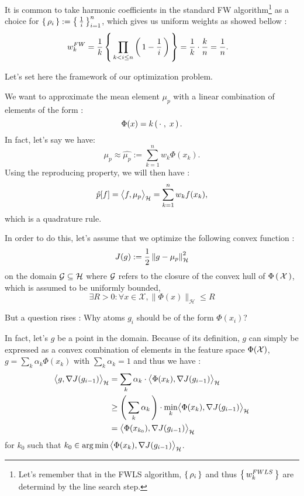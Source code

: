 It is common to take harmonic coefficients in the standard FW algorithm\footnote{Let's remember that in the FWLS algorithm, $\left \{ \, \rho_i \, \right \}$ and thus $\left \{ \, w_k^{FWLS} \, \right \}$ are
determind by the line search step.} as a choice for $\left \{ \, \rho_i \, \right \}:= \left \{ \, \frac{1}{i} \, \right \}_{i=1}^n$,
 which gives us uniform weights as showed bellow :
 \begin{align*}
w_k^{FW} &= \frac{1}{k} \left \{ \, \prod_{k<i\leq n} \left( \, 1-\frac{1}{i} \, \right) \, \right \}= \frac{1}{k} \cdot \frac{k}{n} = \frac{1}{n}.
\end{align*}

Let's set here the framework of our optimization problem.

\begin{boxproblem}
  We want to approximate the mean element $\mu_p$ with a linear combination of
  elements of the form :$$\Phi(x)= k\left( \, \cdot\;,\; x \, \right).$$
  In fact, let's say we have:
   $$\mu_p \approx \hat{\mu_p} := \sum_{k=1}^n w_k \Phi(x_k).$$
   Using the reproducing property, we will then have :
   $$\hat{p}[f]= \bigl \langle f , \mu_p \bigr \rangle_{\mathcal{H}} = \sum_{k=1}^n w_k f(x_k),$$
   which is a quadrature rule.

   In order to do this, let's assume that we optimize the following convex function :
   \begin{equation}
     J(g):= \frac{1}{2} \norme{g-\mu_p}^2
   \end{equation}
on the domain $\mathcal{G} \subseteq \mathcal{H}$ where $\mathcal{G}$ refers to the closure of the convex hull
of $\Phi\left( \, \mathcal{X} \, \right)$, which is assumed to be uniformly bounded, \ie
\begin{equation*}
  \exists R > 0 : \forall x \in \mathcal { X } , \| \Phi ( x ) \| _ { \mathcal { H } } \leq R
\end{equation*}

\end{boxproblem}
But a question rises : Why atoms $g_i$ should be of the form $\Phi(x_i)$?

In fact, let's
 $g$ be a point in the domain. Because of its definition,
  $g$ can simply be expressed as a convex combination of elements in the feature space $\Phi(\mathcal{X})$, \ie $g = \sum_k \alpha_k \Phi(x_k)$ with $\sum_k \alpha_k=1$ and thus we have :
 \begin{align*}
   \bigl \langle g , \operatorname{\nabla\!}{J}(g_{i-1}) \bigr \rangle_{\mathcal{H}} &= \sum_k \alpha_k \cdot \bigl \langle \Phi(x_k) , \operatorname{\nabla\!}{J}(g_{i-1}) \bigr \rangle_{\mathcal{H}}\\
   &\geq \left( \, \sum_k \alpha_k \, \right) \cdot \min_{k} \bigl \langle \Phi(x_k) , \operatorname{\nabla\!}{J}(g_{i-1}) \bigr \rangle_{\mathcal{H}}\\
   &= \bigl \langle \Phi(x_{k_0}) , \operatorname{\nabla\!}{J}(g_{i-1}) \bigr \rangle_{\mathcal{H}}
 \end{align*}
 for $k_0$ such that $k_0 \in \operatorname*{arg\,min}{\bigl \langle \Phi(x_k) , \operatorname{\nabla\!}{J}(g_{i-1}) \bigr \rangle_{\mathcal{H}}}$.

